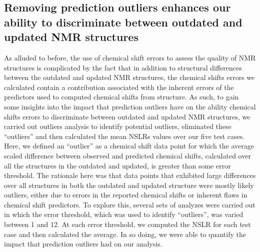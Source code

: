 \documentclass[fleqn,10pt]{wlscirep}
\begin{document}
\subsection*{Removing prediction outliers enhances our ability to discriminate between outdated and updated NMR structures} As alluded to before, the use of chemical shift errors to assess the quality of NMR structures is complicated by the fact that in addition to structural differences between the outdated and updated NMR structures, the chemical shifts errors we calculated contain a contribution associated with the inherent errors of the predictors used to computed chemical shifts from structure. As such, to gain some  insights into the impact that prediction outliers have on the ability chemical shifts errors to discriminate between outdated and updated NMR structures, we carried out outliers analysis to identify potential outliers, eliminated these ``outliers'' and then calculated the mean NSLRs values over our five test cases. Here, we defined an ``outlier'' as a chemical shift data point for which the average scaled difference between observed and predicted chemical shifts, calculated over all the structures in the outdated and updated, is greater than some error threshold. The rationale here was that data points that exhibited large differences over all structures in both the outdated and updated structure were mostly likely outliers,  either due to errors in the reported chemical shifts or inherent flaws in chemical shift predictors. To explore this,  several sets of analyzes were carried out in which the error threshold, which was used to identify ``outliers'', was varied between 1 and 12. At each error threshold, we computed the NSLR for each test case and then calculated the average. In so doing, we were able to quantify the impact that prediction outliers had on our analysis.
\end{document}
